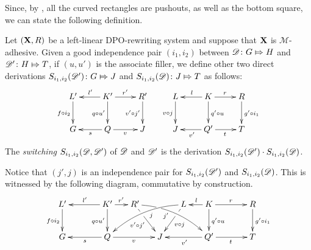 	Since, by , all the curved rectangles are pushouts, as well as the bottom square, we can state the following definition.
\begin{definition}\label{def:switch}
	Let $(\textbf {\textup{X}},R)$ be a left-linear DPO-rewriting system and suppose that $\textbf {\textup{X}}$ is $\mathcal{M}$-adhesive. Given a good independence pair $(i_1, i_2)$ between $\mathscr{D}\colon G\Mapsto H$ and $\mathscr{D}'\colon H\Mapsto T$, if $(u,u')$ is the associate filler, we define other two direct derivations $S_{i_1,i_2}(\mathscr{D}')\colon G\Mapsto J$ and $S_{i_1,i_2}(\mathscr{D})\colon J\Mapsto T$ as follows:
		\[\xymatrix{L' \ar[d]_{f\circ i_2}& \ar[l]_{l'}K'\ar[d]_{q\circ u'} \ar[r]^{r'} & R' \ar[d]_{v'\circ j'} & L \ar[d]_{v\circ j} & \ar[l]_{l}K \ar[d]^{q'\circ u}\ar[r]^{r}& R \ar[d]^{g'\circ i_1}\\
		G &\ar[l]^{s} Q \ar[r]_{v}& J&J & \ar[l]^{v'}Q' \ar[r]_{t} & T}\]
	The \emph{switching} $S_{i_1,i_2}(\mathscr{D}, \mathscr{D'})$ of $\mathscr{D}$ and $\mathscr{D'}$ is the derivation $S_{i_1,i_2}(\mathscr{D}')\cdot S_{i_1,i_2}(\mathscr{D})$.
\end{definition}

\begin{remark}\label{rem:indip}Notice that $(j', j)$ is an independence pair for $S_{i_1,i_2}(\mathscr{D}')$ and $S_{i_1,i_2}(\mathscr{D})$. This is witnessed by the following diagram, commutative by construction.
	\[\xymatrix@C=15pt{L' \ar[d]_{f\circ i_2}&& K' \ar[d]_{q\circ u'}\ar[ll]_{l'} \ar[r]^{r'} & R' \ar@/^.35cm/[drrr]_(.4){j'}|(.285)\hole \ar[dr]|(.28)\hole_{v'\circ j'} && L \ar@/_.35cm/[dlll]^(.4){j} \ar[dl]|(.28)\hole^{v\circ j}& K \ar[d]^{q'\circ u}\ar[l]_{l} \ar[rr]^{r} && R \ar[d]^{g'\circ i_1}\\G && \ar[ll]^{s} Q \ar[rr]_{v}&& J  && \ar[ll]^{v'} Q' \ar[rr]_{t}&& T}\]
\end{remark} 
 
